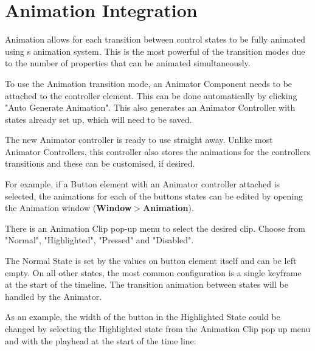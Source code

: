 \chapter{Animation Integration}
\hypertarget{md__library_2_package_cache_2com_8unity_8ugui_0d1_80_80_2_documentation_0i_2_u_i_animation_integration}{}\label{md__library_2_package_cache_2com_8unity_8ugui_0d1_80_80_2_documentation_0i_2_u_i_animation_integration}
\label{md__library_2_package_cache_2com_8unity_8ugui_0d1_80_80_2_documentation_0i_2_u_i_animation_integration_autotoc_md1464}%
%
 Animation allows for each transition between control states to be fully animated using \textquotesingle{}s animation system. This is the most powerful of the transition modes due to the number of properties that can be animated simultaneously.



To use the Animation transition mode, an Animator Component needs to be attached to the controller element. This can be done automatically by clicking "{}\+Auto Generate Animation"{}. This also generates an Animator Controller with states already set up, which will need to be saved.

The new Animator controller is ready to use straight away. Unlike most Animator Controllers, this controller also stores the animations for the controller\textquotesingle{}s transitions and these can be customised, if desired.



For example, if a Button element with an Animator controller attached is selected, the animations for each of the button\textquotesingle{}s states can be edited by opening the Animation window ({\bfseries{Window\texorpdfstring{$>$}{>}Animation}}).

There is an Animation Clip pop-\/up menu to select the desired clip. Choose from "{}\+Normal"{}, "{}\+Highlighted"{}, "{}\+Pressed"{} and "{}\+Disabled"{}.



The Normal State is set by the values on button element itself and can be left empty. On all other states, the most common configuration is a single keyframe at the start of the timeline. The transition animation between states will be handled by the Animator.

As an example, the width of the button in the Highlighted State could be changed by selecting the Highlighted state from the Animation Clip pop up menu and with the playhead at the start of the time line\+:


